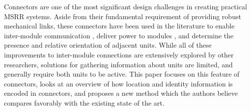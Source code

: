 Connectors are one of the most significant design challenges in creating practical MSRR systems. Aside from their fundamental requirement of providing robust mechanical links, these connectors have been used in the literature to enable inter-module communication \cite{liedke2013collective} \cite{TosunDaveyLiuYim-IROS2016}, deliver power to modules \cite{OptimalPowerSharing2016}, and determine the presence and relative orientation of adjacent units. While all of these improvements to inter-module connections are extensively explored by other researchers, solutions for gathering information about units are limited, and generally require both units to be active.  This paper focuses on this feature of connectors, looks at an overview of how location and identity information is encoded in connectors, and proposes a new method which the authors believe compares favorably with the existing state of the art.

